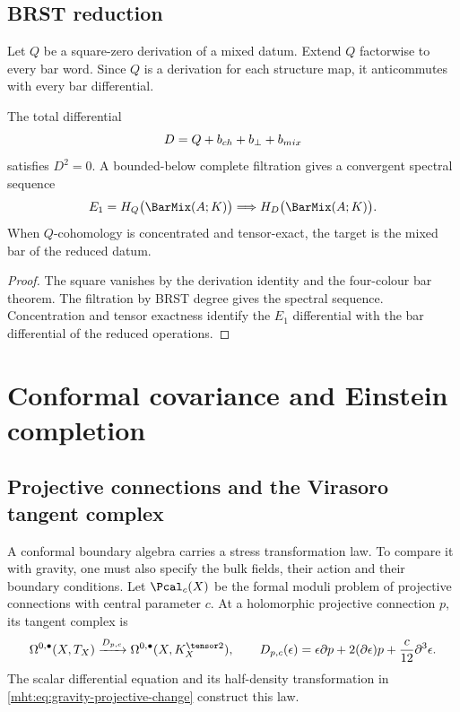 \chapter{BRST reduction}
Let $Q$ be a square-zero derivation of a mixed datum.  Extend $Q$ factorwise to every bar word.  Since $Q$ is a derivation for each structure map, it anticommutes with every bar differential.

\begin{theorem}
The total differential
\[
 D=Q+b_{ch}+b_\perp+b_{mix}
\]
satisfies $D^2=0$.  A bounded-below complete filtration gives a convergent spectral sequence
\[
 E_1=H_Q\bigl(\BarMix(\mathbb A;K)\bigr)
 \Longrightarrow H_D\bigl(\BarMix(\mathbb A;K)\bigr).
\]
When $Q$-cohomology is concentrated and tensor-exact, the target is the mixed bar of the reduced datum.
\end{theorem}
\begin{proof}
The square vanishes by the derivation identity and the four-colour bar theorem.  The filtration by BRST degree gives the spectral sequence.  Concentration and tensor exactness identify the $E_1$ differential with the bar differential of the reduced operations.
\end{proof}

\part{Conformal covariance and Einstein completion}


\chapter{Projective connections and the Virasoro tangent complex}
A conformal boundary algebra carries a stress transformation law.
To compare it with gravity, one must also specify the bulk fields,
their action and their boundary conditions.
Let $\Pcal_c(X)$ be the formal moduli problem of projective
connections with central parameter $c$.
At a holomorphic projective connection $p$, its tangent complex is
\[
 \Omega^{0,\bullet}(X,T_X)
 \xrightarrow{\mathcal D_{p,c}}
 \Omega^{0,\bullet}(X,K_X^{\tensor2}),
 \qquad
 \mathcal D_{p,c}(\epsilon)
 =\epsilon\partial p+2(\partial\epsilon)p+\frac{c}{12}\partial^3\epsilon.
\]
The scalar differential equation and its half-density transformation
in \eqref{mht:eq:gravity-projective-change} construct this law.

